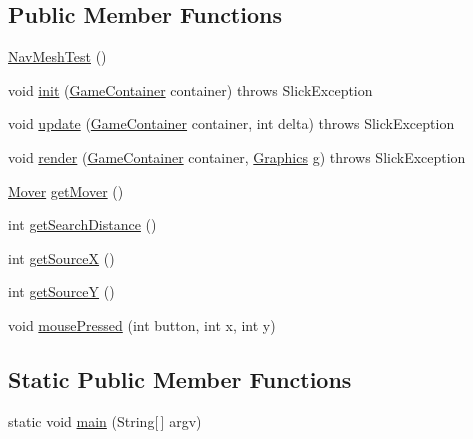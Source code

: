 \subsection*{Public Member Functions}
\begin{DoxyCompactItemize}
\item 
\mbox{\hyperlink{classorg_1_1newdawn_1_1slick_1_1tests_1_1_nav_mesh_test_a55eff0f99dac7ecd6af36752d1702ca7}{Nav\+Mesh\+Test}} ()
\item 
void \mbox{\hyperlink{classorg_1_1newdawn_1_1slick_1_1tests_1_1_nav_mesh_test_a5cc5ff5d79dbd5f96dd04f38ad8259e7}{init}} (\mbox{\hyperlink{classorg_1_1newdawn_1_1slick_1_1_game_container}{Game\+Container}} container)  throws Slick\+Exception 
\item 
void \mbox{\hyperlink{classorg_1_1newdawn_1_1slick_1_1tests_1_1_nav_mesh_test_a708e58f775d5025a46c0539b86cef92d}{update}} (\mbox{\hyperlink{classorg_1_1newdawn_1_1slick_1_1_game_container}{Game\+Container}} container, int delta)  throws Slick\+Exception 
\item 
void \mbox{\hyperlink{classorg_1_1newdawn_1_1slick_1_1tests_1_1_nav_mesh_test_ab3dcdd6363f3580d3107091b75b7e820}{render}} (\mbox{\hyperlink{classorg_1_1newdawn_1_1slick_1_1_game_container}{Game\+Container}} container, \mbox{\hyperlink{classorg_1_1newdawn_1_1slick_1_1_graphics}{Graphics}} g)  throws Slick\+Exception 
\item 
\mbox{\hyperlink{interfaceorg_1_1newdawn_1_1slick_1_1util_1_1pathfinding_1_1_mover}{Mover}} \mbox{\hyperlink{classorg_1_1newdawn_1_1slick_1_1tests_1_1_nav_mesh_test_ac645cd0e18a27972590065e165b949f1}{get\+Mover}} ()
\item 
int \mbox{\hyperlink{classorg_1_1newdawn_1_1slick_1_1tests_1_1_nav_mesh_test_ada8b9e7b14d4ca0de9094cd67f0ec9bf}{get\+Search\+Distance}} ()
\item 
int \mbox{\hyperlink{classorg_1_1newdawn_1_1slick_1_1tests_1_1_nav_mesh_test_af3706d73f28af86dd69006f8095f76ef}{get\+SourceX}} ()
\item 
int \mbox{\hyperlink{classorg_1_1newdawn_1_1slick_1_1tests_1_1_nav_mesh_test_a97359fb033667ef886d266231204adcf}{get\+SourceY}} ()
\item 
void \mbox{\hyperlink{classorg_1_1newdawn_1_1slick_1_1tests_1_1_nav_mesh_test_ab74b2ac83a83fa278dbfc76a9563b921}{mouse\+Pressed}} (int button, int x, int y)
\end{DoxyCompactItemize}
\subsection*{Static Public Member Functions}
\begin{DoxyCompactItemize}
\item 
static void \mbox{\hyperlink{classorg_1_1newdawn_1_1slick_1_1tests_1_1_nav_mesh_test_a32755555d86d681a4c3af3daab191d05}{main}} (String\mbox{[}$\,$\mbox{]} argv)
\end{DoxyCompactItemize}
